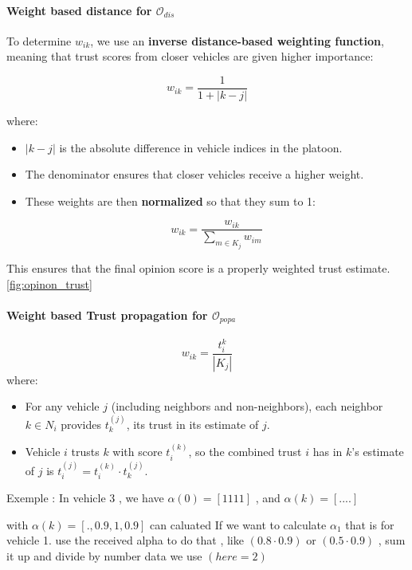 \documentclass[letterpaper, 10pt, conference]{ieeeconf}  %
\begin{document}
\paragraph{Weight based distance for $\mathcal{O}_{dis}$}
To determine \( w_{ik} \), we use an \textbf{inverse distance-based weighting function}, meaning that trust scores from closer vehicles are given higher importance:

\[
w_{ik} = \frac{1}{1 + |k - j|}
\]

where:
\begin{itemize}
    \item \( |k - j| \) is the absolute difference in vehicle indices in the platoon.
    \item The denominator ensures that closer vehicles receive a higher weight.
    \item These weights are then \textbf{normalized} so that they sum to 1:

    \[
    w_{ik} = \frac{w_{ik}}{\sum_{m \in K_j} w_{im}}
    \]
\end{itemize}

This ensures that the final opinion score is a properly weighted trust estimate.\ref{fig:opinon_trust}
\paragraph{Weight based Trust propagation for $\mathcal{O}_{popa}$}

\begin{equation}
    w_{ik} = \frac{t_{i}^k}{ |K_j|}
\end{equation}
where:
\begin{itemize}
    \item For any vehicle $j$ (including neighbors and non-neighbors), each neighbor $k \in N_i$ provides $t_k^{(j)}$, its trust in its estimate of $j$. 
    \item Vehicle $i$ trusts $k$ with score $t_i^{(k)}$, so the combined trust $i$ has in $k$'s estimate of $j$ is $t_i^{(j)} =  t_i^{(k)} \cdot t_k^{(j)}$. 
\end{itemize}

Exemple : 	In vehicle 3 , we have $\alpha(0) = [1 1 1 1]$ , and $\alpha(k) = [....]$

with $\alpha(k) = [. , 0.9, 1, 0.9]$ can caluated
If we want to calculate $\alpha_1$ that is for vehicle 1. use the received alpha to do that , like $(0.8 \cdot 0.9 )$  or $(0.5 \cdot 0.9 )$ , sum it up and divide by number data we use $(here = 2)$
\end{document}
